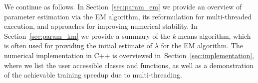 We continue as follows.
In Section~\ref{sec:param_em} we provide an overview of parameter estimation via the EM algorithm,
its reformulation for multi-threaded execution,
and approaches for improving numerical stability.
In Section~\ref{sec:param_km} we provide a summary of the {\it k}-means algorithm,
which is often used for providing the initial estimate of $\lambda$ for the EM algorithm.
The numerical implementation in C++ is overviewed in~Section~\ref{sec:implementation},
where we list the user accessible classes and functions,
as well as a demonstration of the achievable training speedup due to multi-threading.




